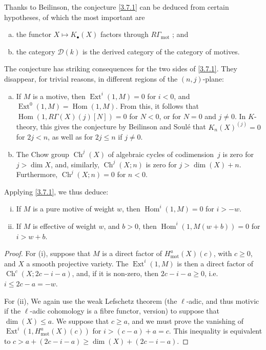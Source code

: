 \documentclass{article}
\theoremstyle{plain}
\newenvironment{nullities}[1]
  {\renewcommand\theinnercustomnullities{#1}\innercustomnullities}
  {\endinnercustomnullities}
\theoremstyle{definition}
\newcommand{\sh}{\mathscr}
\newcommand{\mot}{\mathrm{mot}}
\renewcommand{\geq}{\geqslant}
\renewcommand{\leq}{\leqslant}
\DeclareMathOperator{\Hom}{Hom}
\DeclareMathOperator{\Ext}{Ext}
\DeclareMathOperator{\Ch}{Ch}
\begin{document}
Thanks to Beilinson, the conjecture \cref{3.7.1} can be deduced from certain hypotheses, of which the most important are
\begin{enumerate}[(a)]
  \item the functor $X\mapsto K_\bullet(X)$ factors through $R\Gamma_\mot$ ; and
  \item the category $\sh{D}(k)$ is the derived category of the category of motives.
\end{enumerate}
The conjecture has striking consequences for the two sides of \cref{3.7.1}.
They disappear, for trivial reasons, in different regions of the $(n,j)$-plane:
\begin{enumerate}[(a)]
  \item If $M$ is a motive, then $\Ext^i(1,M)=0$ for $i<0$, and $\Ext^0(1,M)=\Hom(1,M)$.
    From this, it follows that $\Hom(1,R\Gamma(X)(j)[N])=0$ for $N<0$, or for $N=0$ and $j\neq0$.
    In $K$-theory, this gives the conjecture by Beilinson and Soul\'{e} that $K_n(X)^{(j)}=0$ for $2j<n$, as well as for $2j\leq n$ if $j\neq0$.
  \item The Chow group $\Ch^j(X)$ of algebraic cycles of codimension~$j$ is zero for $j>\dim X$, and, similarly, $\Ch^j(X;n)$ is zero for $j>\dim(X)+n$.
    Furthermore, $\Ch^j(X;n)=0$ for $n<0$.
\end{enumerate}
Applying \cref{3.7.1}, we thus deduce:

\begin{nullities}{3.8.1}
\label{3.8.1}
  \begin{enumerate}[(i)]
    \item If $M$ is a pure motive of weight $w$, then $\Hom^i(1,M)=0$ for $i>-w$.
    \item If $M$ is effective of weight $w$, and $b>0$, then $\Hom^i(1,M(w+b))=0$ for $i>w+b$.
  \end{enumerate}
\end{nullities}

\begin{proof}
  For (i), suppose that $M$ is a direct factor of $H_\mot^a(X)(c)$, with $c\geq0$, and $X$ a smooth projective variety.
  The $\Ext^i(1,M)$ is then a direct factor of $\Ch^c(X;2c-i-a)$, and, if it is non-zero, then $2c-i-a\geq0$, i.e. $i\leq 2c-a=-w$.

  For (ii), We again use the weak Lefschetz theorem (the $\ell$-adic, and thus motivic if the $\ell$-adic cohomology is a fibre functor, version) to suppose that $\dim(X)\leq a$.
  We suppose that $c\geq a$, and we must prove the vanishing of $\Ext^i(1,H_\mot^a(X)(c))$ for $i>(c-a)+a=c$.
  This inequality is equivalent to $c>a+(2c-i-a)\geq\dim(X)+(2c-i-a)$.
\end{proof}
\end{document}

